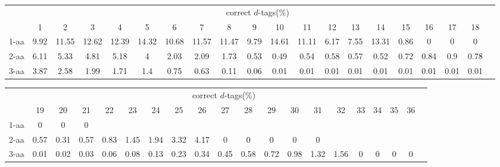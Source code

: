 \begin{table}[h]\tiny
\vspace{3mm}
{\centering
\begin{center}
\begin{tabular}{|l|c|c|c|c|c|c|c|c|c|c|c|c|c|c|c|c|c|c|c|}
  \hline
  & \multicolumn{ 18 }{|c|}{correct $d$-tags(\%)} \\
  \cline{2- 19}
    & 1 & 2 & 3 & 4 & 5 & 6 & 7 & 8 & 9 & 10 & 11 & 12 & 13 & 14 & 15 & 16 & 17 & 18\\
  \hline
1-aa  & 9.92 & 11.55 & 12.62 & 12.39 & 14.32 & 10.68 & 11.57 & 11.47 & 9.79 & 14.61 & 11.11 & 6.17 & 7.55 & 13.31 & 0.86 & 0 & 0 & 0\\
2-aa  & 6.11 & 5.33 & 4.81 & 5.18 & 4 & 2.03 & 2.09 & 1.73 & 0.53 & 0.49 & 0.54 & 0.58 & 0.57 & 0.52 & 0.72 & 0.84 & 0.9 & 0.78\\
3-aa  & 3.87 & 2.58 & 1.99 & 1.71 & 1.4 & 0.75 & 0.63 & 0.11 & 0.06 & 0.01 & 0.01 & 0.01 & 0.01 & 0.01 & 0.01 & 0.01 & 0.01 & 0.01\\
 \hline
\end{tabular}
\end{center}
\par}
\centering

\vspace{3mm}
\label{table:correct-d-tags}
\end{table}
\begin{table}[h]\tiny
\vspace{3mm}
{\centering
\begin{center}
\begin{tabular}{|l|c|c|c|c|c|c|c|c|c|c|c|c|c|c|c|c|c|c|c|}
  \hline
  & \multicolumn{ 18 }{|c|}{correct $d$-tags(\%)} \\
  \cline{2- 19}
    & 19 & 20 & 21 & 22 & 23 & 24 & 25 & 26 & 27 & 28 & 29 & 30 & 31 & 32 & 33 & 34 & 35 & 36\\
  \hline
1-aa  & 0 & 0 & 0 &  &  &  &  &  &  &  &  &  &  &  &  &  &  & \\
2-aa  & 0.57 & 0.31 & 0.57 & 0.83 & 1.45 & 1.94 & 3.32 & 4.17 & 0 & 0 & 0 & 0 & 0 &  &  &  &  & \\
3-aa  & 0.01 & 0.02 & 0.03 & 0.06 & 0.08 & 0.13 & 0.23 & 0.34 & 0.45 & 0.58 & 0.72 & 0.98 & 1.32 & 1.56 & 0 & 0 & 0 & 0\\
 \hline
\end{tabular}
\end{center}
\par}
\centering

\vspace{3mm}
\label{table:correct-d-tags}
\end{table}
